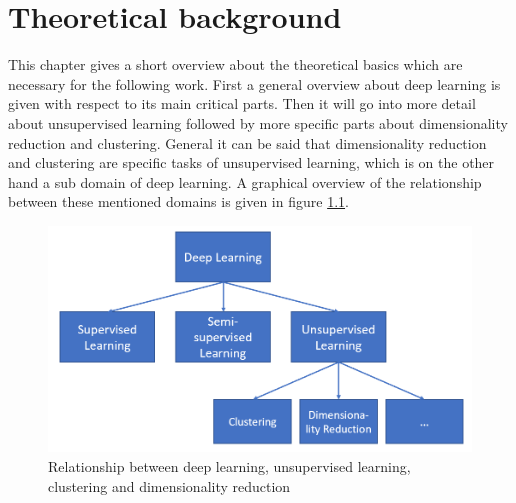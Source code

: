\documentclass[12pt,DIV14,BCOR12mm,a4paper,footexclude,headinclude,halfparskip-,twoside,openright,cleardoubleempty,idxtotoc,bibtotoc,listtotoc]{scrreprt} %
\numberwithin{equation}{chapter}
\begin{document}
\chapter{Theoretical background}
This chapter gives a short overview about the theoretical basics which are necessary for the following work. First a general overview about deep learning is given with respect to its main critical parts. Then it will go into more detail about unsupervised learning followed by more specific parts about dimensionality reduction and clustering. General it can be said that dimensionality reduction and clustering are specific tasks of unsupervised learning, which is on the other hand a sub domain of deep learning. A graphical overview of the relationship between these mentioned domains is given in figure \ref{fig:Relationship_DL}. 
\begin{figure}[htb!]
	\centering
	\includegraphics[width=0.5\linewidth]{Graphiken/Overview_Deep_Learning}
	\caption{Relationship between deep learning, unsupervised learning, clustering and dimensionality reduction}
	\label{fig:Relationship_DL}
\end{figure}
\end{document}
